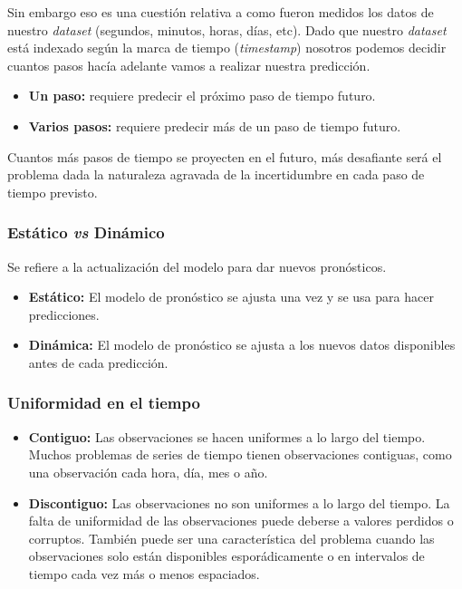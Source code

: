 \documentclass[a4paper,12pt]{article}
\begin{document}
Sin embargo eso es una cuestión relativa a como fueron medidos los datos de nuestro \textit{dataset} (segundos, minutos, horas, días, etc). Dado que nuestro \textit{dataset} está indexado según la marca de tiempo (\textit{timestamp}) nosotros podemos decidir cuantos pasos hacía adelante vamos a realizar nuestra predicción.

\begin{itemize}[noitemsep, topsep=2pt]
	\item \textbf{Un paso:} requiere predecir el próximo paso de tiempo futuro.
	\item \textbf{Varios pasos:} requiere predecir más de un paso de tiempo futuro.
\end{itemize}

Cuantos más pasos de tiempo se proyecten en el futuro, más desafiante será el problema dada la naturaleza agravada de la incertidumbre en cada paso de tiempo previsto.

\subsubsection{Estático \textit{vs} Dinámico}
Se refiere a la actualización del modelo para dar nuevos pronósticos.
\begin{itemize}[noitemsep, topsep=2pt]
	\item \textbf{Estático:} El modelo de pronóstico se ajusta una vez y se usa para hacer predicciones.
	\item \textbf{Dinámica:} El modelo de pronóstico se ajusta a los nuevos datos disponibles antes de cada predicción.
\end{itemize}

\subsubsection{Uniformidad en el tiempo}
\begin{itemize}[noitemsep, topsep=2pt]
	\item \textbf{Contiguo:} Las observaciones se hacen uniformes a lo largo del tiempo. Muchos problemas de series de tiempo tienen observaciones contiguas, como una observación cada hora, día, mes o año.
	\item \textbf{Discontiguo:} Las observaciones no son uniformes a lo largo del tiempo. La falta de uniformidad de las observaciones puede deberse a valores perdidos o corruptos. También puede ser una característica del problema cuando las observaciones solo están disponibles esporádicamente o en intervalos de tiempo cada vez más o menos espaciados.
\end{itemize}
\end{document}
